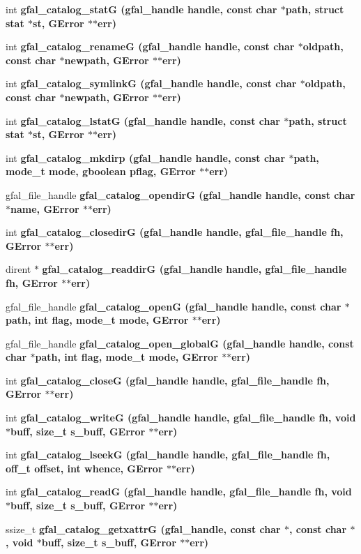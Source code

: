 \begin{CompactItemize}
\item 
int \bf{gfal\_\-catalog\_\-stat\-G} (gfal\_\-handle handle, const char $\ast$path, struct stat $\ast$st, GError $\ast$$\ast$err)
\item 
int \bf{gfal\_\-catalog\_\-rename\-G} (gfal\_\-handle handle, const char $\ast$oldpath, const char $\ast$newpath, GError $\ast$$\ast$err)
\item 
int \bf{gfal\_\-catalog\_\-symlink\-G} (gfal\_\-handle handle, const char $\ast$oldpath, const char $\ast$newpath, GError $\ast$$\ast$err)
\item 
int \bf{gfal\_\-catalog\_\-lstat\-G} (gfal\_\-handle handle, const char $\ast$path, struct stat $\ast$st, GError $\ast$$\ast$err)
\item 
int \bf{gfal\_\-catalog\_\-mkdirp} (gfal\_\-handle handle, const char $\ast$path, mode\_\-t mode, gboolean pflag, GError $\ast$$\ast$err)
\item 
gfal\_\-file\_\-handle \bf{gfal\_\-catalog\_\-opendir\-G} (gfal\_\-handle handle, const char $\ast$name, GError $\ast$$\ast$err)
\item 
int \bf{gfal\_\-catalog\_\-closedir\-G} (gfal\_\-handle handle, gfal\_\-file\_\-handle fh, GError $\ast$$\ast$err)
\item 
dirent $\ast$ \bf{gfal\_\-catalog\_\-readdir\-G} (gfal\_\-handle handle, gfal\_\-file\_\-handle fh, GError $\ast$$\ast$err)
\item 
gfal\_\-file\_\-handle \bf{gfal\_\-catalog\_\-open\-G} (gfal\_\-handle handle, const char $\ast$path, int flag, mode\_\-t mode, GError $\ast$$\ast$err)
\item 
gfal\_\-file\_\-handle \bf{gfal\_\-catalog\_\-open\_\-global\-G} (gfal\_\-handle handle, const char $\ast$path, int flag, mode\_\-t mode, GError $\ast$$\ast$err)
\item 
int \bf{gfal\_\-catalog\_\-close\-G} (gfal\_\-handle handle, gfal\_\-file\_\-handle fh, GError $\ast$$\ast$err)
\item 
int \bf{gfal\_\-catalog\_\-write\-G} (gfal\_\-handle handle, gfal\_\-file\_\-handle fh, void $\ast$buff, size\_\-t s\_\-buff, GError $\ast$$\ast$err)
\item 
int \bf{gfal\_\-catalog\_\-lseek\-G} (gfal\_\-handle handle, gfal\_\-file\_\-handle fh, off\_\-t offset, int whence, GError $\ast$$\ast$err)
\item 
int \bf{gfal\_\-catalog\_\-read\-G} (gfal\_\-handle handle, gfal\_\-file\_\-handle fh, void $\ast$buff, size\_\-t s\_\-buff, GError $\ast$$\ast$err)
\item 
ssize\_\-t \bf{gfal\_\-catalog\_\-getxattr\-G} (gfal\_\-handle, const char $\ast$, const char $\ast$, void $\ast$buff, size\_\-t s\_\-buff, GError $\ast$$\ast$err)\label{gfal__common__catalog_8h_27fe5dcada7d1a0884baf3df98cf34c8}


\end{CompactItemize}

